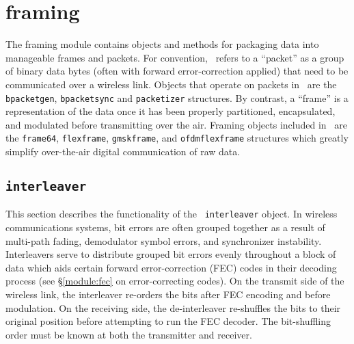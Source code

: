 % 
%

\newpage
\section{framing}
\label{module:framing}
The framing module contains objects and methods for packaging data into
manageable frames and packets.
For convention, \liquid\ refers to a ``packet'' as a group of binary
data bytes (often with forward error-correction applied)
that need to be communicated over a wireless link.
Objects that operate on packets in \liquid\ are the
{\tt bpacketgen}, {\tt bpacketsync} and {\tt packetizer} structures.
By contrast, a ``frame'' is a representation of the data once it has been
properly partitioned, encapsulated, and modulated before transmitting over the
air.
Framing objects included in \liquid\ are the
{\tt frame64}, {\tt flexframe}, {\tt gmskframe}, and
{\tt ofdmflexframe} structures
which greatly simplify over-the-air digital communication of raw data.


% 
%
\subsection{{\tt interleaver}}
\label{module:framing:interleaver}
This section describes the functionality of the \liquid\ {\tt interleaver}
object.
In wireless communications systems, bit errors are often grouped together as a
result of multi-path fading, demodulator symbol errors, and synchronizer
instability.
Interleavers serve to distribute grouped bit errors evenly throughout a block
of data which aids certain forward error-correction (FEC) codes in their
decoding process (see \S\ref{module:fec} on error-correcting codes).
On the transmit side of the wireless link, the interleaver re-orders the bits
after FEC encoding and before modulation.
On the receiving side, the de-interleaver re-shuffles the bits to their
original position before attempting to run the FEC decoder.
The bit-shuffling order must be known at both the transmitter and receiver.

